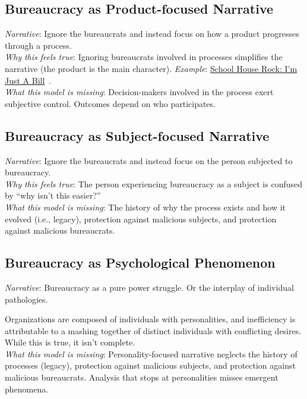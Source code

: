 \subsection*{Bureaucracy as Product-focused Narrative}
\textit{Narrative}: Ignore the bureaucrats and instead focus on how a product progresses through a process.\\
\textit{Why this feels true}: Ignoring bureaucrats involved in processes simplifies the narrative (the product is the main character). 
\textit{Example}: \href{https://www.youtube.com/watch?v=OgVKvqTItto}{School House Rock: I'm Just A Bill}~\cite{1975_Frishberg}.\\
\textit{What this model is missing}: Decision-makers involved in the process exert subjective control. Outcomes depend on who participates. 

\subsection*{Bureaucracy as Subject-focused Narrative}
\textit{Narrative}: Ignore the bureaucrats and instead focus on the person subjected to bureaucracy. \\
\textit{Why this feels true}: The person experiencing bureaucracy as a subject is confused by ``why isn't this easier?''  \\
\textit{What this model is missing}: The history of why the process exists and how it evolved (i.e., legacy), protection against malicious subjects, and protection against malicious bureaucrats. 


\subsection*{Bureaucracy as Psychological Phenomenon}

\textit{Narrative}: Bureaucracy as a pure power struggle. Or the interplay of individual pathologies. 

Organizations are composed of individuals with personalities, and inefficiency is attributable to a mashing together of distinct individuals with conflicting desires.
While this is true, it isn't complete. \\
\textit{What this model is missing}: Personality-focused narrative neglects the history of processes (legacy), protection against malicious subjects, and protection against malicious bureaucrats. Analysis that stops at personalities misses emergent phenomena. %

